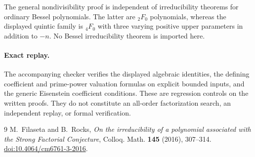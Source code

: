 \documentclass[11pt]{article}
\theoremstyle{remark}
\begin{document}
The general nondivisibility proof is independent of irreducibility
theorems for ordinary Bessel polynomials. The latter are
$ {}_2F_0$ polynomials, whereas the displayed quintic family is
$ {}_4F_0$ with three varying positive upper parameters in addition
to $-n$. No Bessel irreducibility theorem is imported here.

\paragraph{Exact replay.}
The accompanying checker verifies the displayed algebraic identities,
the defining coefficient and prime-power valuation formulas on explicit
bounded inputs, and the generic Eisenstein coefficient conditions.
These are regression controls on the written proofs.
They do not constitute an all-order factorization search, an independent
replay, or formal verification.

\begin{thebibliography}{9}
M.~Filaseta and B.~Rocks,
\emph{On the irreducibility of a polynomial associated with the Strong
Factorial Conjecture},
Colloq. Math. \textbf{145} (2016), 307--314.
\href{https://doi.org/10.4064/cm6761-3-2016}{doi:10.4064/cm6761-3-2016}.
\end{thebibliography}
\end{document}
